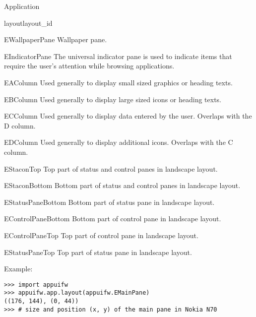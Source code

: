 \begin{classdesc*}{Application}
\begin{methoddesc}[Application]{layout}{layout_id}
\begin{datadesc}{EWallpaperPane} 
Wallpaper pane.  
\end{datadesc}

\begin{datadesc}{EIndicatorPane} 
The universal indicator pane is used to indicate items that require the user's 
attention while browsing applications.  
\end{datadesc}

\begin{datadesc}{EAColumn} 
Used generally to display small sized graphics or heading texts.  
\end{datadesc}

\begin{datadesc}{EBColumn} 
Used generally to display large sized icons or heading texts.  
\end{datadesc}

\begin{datadesc}{ECColumn} 
Used generally to display data entered by the user. Overlaps with the D column. 
\end{datadesc}

\begin{datadesc}{EDColumn} 
Used generally to display additional icons. Overlaps with the C column. 
\end{datadesc}

\begin{datadesc}{EStaconTop} 
Top part of status and control panes in landscape layout.  
\end{datadesc}

\begin{datadesc}{EStaconBottom} 
Bottom part of status and control panes in landscape layout.  
\end{datadesc}

\begin{datadesc}{EStatusPaneBottom} 
Bottom part of status pane in landscape layout.  
\end{datadesc}

\begin{datadesc}{EControlPaneBottom} 
Bottom part of control pane in landscape layout.  
\end{datadesc}

\begin{datadesc}{EControlPaneTop} 
Top part of control pane in landscape layout.  
\end{datadesc}

\begin{datadesc}{EStatusPaneTop} 
Top part of status pane in landscape layout.
\end{datadesc}

Example:
\begin{verbatim}
>>> import appuifw
>>> appuifw.app.layout(appuifw.EMainPane)
((176, 144), (0, 44))
>>> # size and position (x, y) of the main pane in Nokia N70
\end{verbatim}

\end{methoddesc}

\end{classdesc*}

